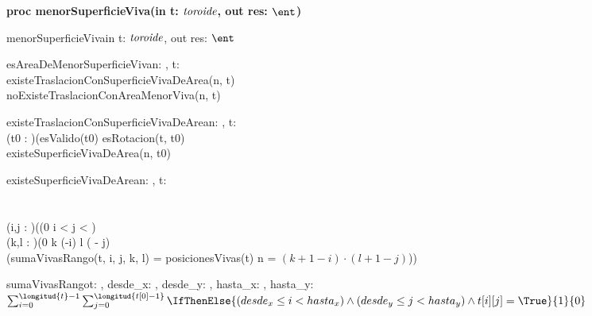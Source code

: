 \documentclass[spanish, a4paper]{article}
\begin{document}
\begin{ejercicio}[:] \textbf{proc menorSuperficieViva(in t: $\textit{toroide}$, out res: $\ent$)}
\\

\begin{proc}{menorSuperficieViva}{in t: $\textit{toroide}$, out res: $\ent$}{}

\end{proc}

\begin{pred}{esAreaDeMenorSuperficieViva}{n: \ent, t: \toroide}{\\
    existeTraslacionConSuperficieVivaDeArea(n, t) \yLuego \\
    noExisteTraslacionConAreaMenorViva(n, t) \\
}
    
\end{pred}

\begin{pred}{existeTraslacionConSuperficieVivaDeArea}{n: \ent, t: \toroide}{\\
(\exists t0 : \TLista{\toroide})(esValido(t0) \yLuego esRotacion(t, t0) \yLuego \\
existeSuperficieVivaDeArea(n, t0) \\
}
\end{pred}

\begin{pred}{existeSuperficieVivaDeArea}{n: \ent, t: \toroide}{\\
 \\
 \\
(\exists i,j : \ent)((0 \leq i <   \leq j < ) \yLuego \\ 
(\forall k,l : \ent)(0 \leq k \leq (-i)  \leq l \leq ( - j) \implicaLuego \\ (sumaVivasRango(t, i, j, k, l) = posicionesVivas(t) \land n = $(k+1-i)\cdot(l+1-j)$)) \\
}
\end{pred}

\begin{aux}{sumaVivasRango}{t: \toroide, desde_x: \ent, desde_y: \ent, hasta_x: \ent, hasta_y: \ent}{\ent}{\\
$\sum_{i=0}^{\longitud{t}-1} \sum_{j=0}^{\longitud{t[0]-1}} \IfThenElse{(desde_x \leq i < hasta_x) \land (desde_y \leq j < hasta_y) \land t[i][j] = \True}{1}{0}$
}


\end{aux}
\end{ejercicio}
\end{document}
